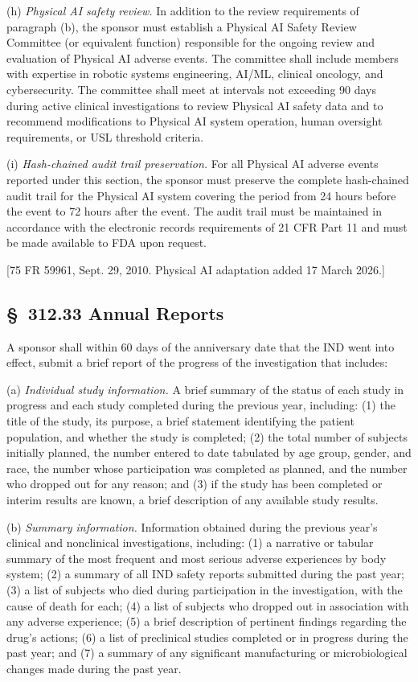 (h) \textit{Physical AI safety review.} In addition to the review requirements of paragraph (b), the sponsor must establish a Physical AI Safety Review Committee (or equivalent function) responsible for the ongoing review and evaluation of Physical AI adverse events. The committee shall include members with expertise in robotic systems engineering, AI/ML, clinical oncology, and cybersecurity. The committee shall meet at intervals not exceeding 90 days during active clinical investigations to review Physical AI safety data and to recommend modifications to Physical AI system operation, human oversight requirements, or USL threshold criteria.

(i) \textit{Hash-chained audit trail preservation.} For all Physical AI adverse events reported under this section, the sponsor must preserve the complete hash-chained audit trail for the Physical AI system covering the period from 24 hours before the event to 72 hours after the event. The audit trail must be maintained in accordance with the electronic records requirements of 21 CFR Part 11 and must be made available to FDA upon request.

[75 FR 59961, Sept. 29, 2010. Physical AI adaptation added 17 March 2026.]

\subsection{\S~312.33 Annual Reports}

A sponsor shall within 60 days of the anniversary date that the IND went into effect, submit a brief report of the progress of the investigation that includes:

(a) \textit{Individual study information.} A brief summary of the status of each study in progress and each study completed during the previous year, including: (1) the title of the study, its purpose, a brief statement identifying the patient population, and whether the study is completed; (2) the total number of subjects initially planned, the number entered to date tabulated by age group, gender, and race, the number whose participation was completed as planned, and the number who dropped out for any reason; and (3) if the study has been completed or interim results are known, a brief description of any available study results.

(b) \textit{Summary information.} Information obtained during the previous year's clinical and nonclinical investigations, including: (1) a narrative or tabular summary of the most frequent and most serious adverse experiences by body system; (2) a summary of all IND safety reports submitted during the past year; (3) a list of subjects who died during participation in the investigation, with the cause of death for each; (4) a list of subjects who dropped out in association with any adverse experience; (5) a brief description of pertinent findings regarding the drug's actions; (6) a list of preclinical studies completed or in progress during the past year; and (7) a summary of any significant manufacturing or microbiological changes made during the past year.

